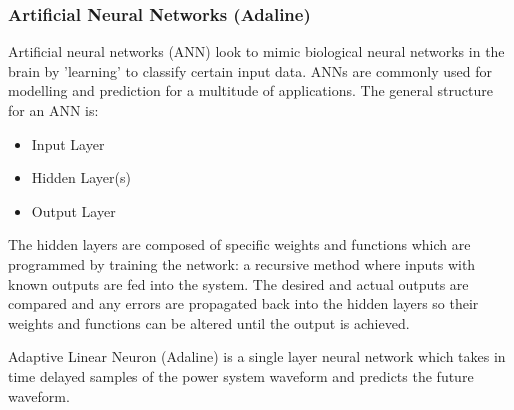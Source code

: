 \documentclass[12pt]{article}
\begin{document}
{\newpage
\subsubsection{Artificial Neural Networks (Adaline)}
Artificial neural networks (ANN) look to mimic biological neural networks in the brain by 'learning' to classify certain input data. ANNs are commonly used for modelling and prediction for a multitude of applications. The general structure for an ANN is:
\begin{itemize}
\item Input Layer
\item Hidden Layer(s)
\item Output Layer
\end{itemize}

The hidden layers are composed of specific weights and functions which are programmed by training the network: a recursive method where inputs with known outputs are fed into the system. The desired and actual outputs are compared and any errors are propagated back into the hidden layers so their weights and functions can be altered until the output is achieved.

Adaptive Linear Neuron (Adaline) is a single layer neural network which takes in time delayed samples of the power system waveform and predicts the future waveform.\\


}
\end{document}
